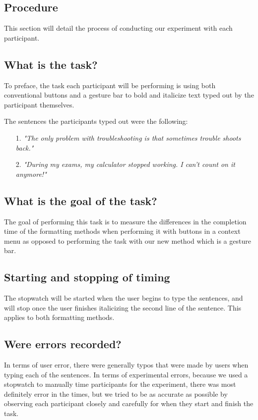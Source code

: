 \documentclass[conference]{IEEEtran}
\begin{document}
\subsection{Procedure}

This section will detail the process of conducting our experiment with each participant.\\

\subsection*{What is the task?}
To preface, the task each participant will be performing is using both conventional buttons and a gesture bar to bold and italicize text typed out by the participant themselves. 

The sentences the participants typed out were the following:

\begin{itemize}
    \item [1.] \textit{"The only problem with troubleshooting is that sometimes trouble shoots back."}
    \item [2.] \textit{"During my exams, my calculator stopped working. I can't count on it anymore!"}
\end{itemize}

\subsection*{What is the goal of the task?}
The goal of performing this task is to measure the differences in the completion time of the formatting methods when performing it with buttons in a context menu as opposed to performing the task with our new method which is a gesture bar.

\subsection*{Starting and stopping of timing}
The stopwatch will be started when the user begins to type the sentences, and will stop once the user finishes italicizing the second line of the sentence. This applies to both formatting methods.

\subsection*{Were errors recorded?}
In terms of user error, there were generally typos that were made by users when typing each of the sentences. In terms of experimental errors, because we used a stopwatch to manually time participants for the experiment, there was most definitely error in the times, but we tried to be as accurate as possible by observing each participant closely and carefully for when they start and finish the task.
\end{document}
